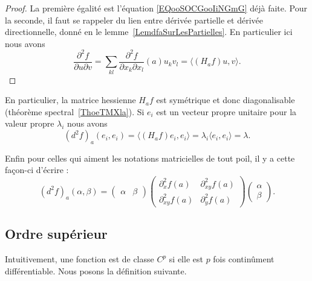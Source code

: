 \begin{proof}
    La première égalité est l'équation \eqref{EQooSOCGooIiNGmG} déjà faite. Pour la seconde, il faut se rappeler du lien entre dérivée partielle et dérivée directionnelle, donné en le lemme~\ref{LemdfaSurLesPartielles}. En particulier ici nous avons
    \begin{equation}
        \frac{ \partial^2f }{ \partial u\partial v }=\sum_{kl}\frac{ \partial^2f }{ \partial x_k\partial x_l  }(a)u_kv_l=\langle (H_af)u, v\rangle .
    \end{equation}
\end{proof}

En particulier, la matrice hessienne \( H_af\) est symétrique et donc diagonalisable (théorème spectral~\ref{ThoeTMXla}). Si \( e_i\) est un vecteur propre unitaire pour la valeur propre \( \lambda_i\) nous avons
\begin{equation}
    (d^2f)_a(e_i,e_i)=\langle (H_af)e_i, e_i\rangle =\lambda_i\langle e_i, e_i\rangle =\lambda.
\end{equation}

Enfin pour celles qui aiment les notations matricielles de tout poil, il y a cette façon-ci d'écrire :
\begin{equation}
    (d^2f)_a(\alpha,\beta)=\begin{pmatrix}
        \alpha    &   \beta
    \end{pmatrix}\begin{pmatrix}
        \partial^2_xf(a)    &   \partial^2_{xy}f(a)    \\
        \partial^2_{xy}f(a)    &   \partial^2_yf(a)
    \end{pmatrix}\begin{pmatrix}
        \alpha    \\
        \beta
    \end{pmatrix}.
\end{equation}

\subsection{Ordre supérieur}

Intuitivement, une fonction est de classe \( C^p\) si elle est \( p\) fois continûment différentiable. Nous posons la définition suivante.

